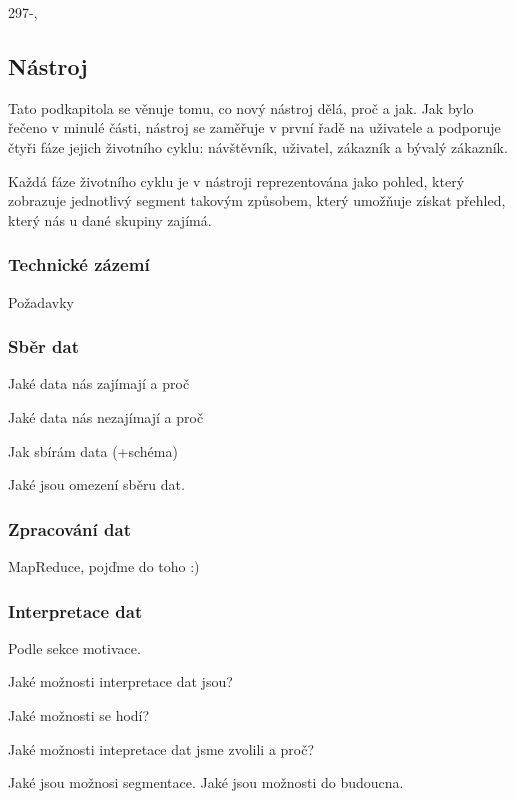 \documentclass[bc,female,java,dept456]{diploma}						%
\begin{document}
297-,





\subsection{Nástroj}

Tato podkapitola se věnuje tomu, co nový nástroj dělá, proč a jak. Jak bylo řečeno v minulé části, nástroj se zaměřuje v první řadě na uživatele a podporuje čtyři fáze jejich životního cyklu: návštěvník, uživatel, zákazník a bývalý zákazník.

Každá fáze životního cyklu je v nástroji reprezentována jako pohled, který zobrazuje jednotlivý segment takovým způsobem, který umožňuje získat přehled, který nás u dané skupiny zajímá.


\subsubsection{Technické zázemí}

Požadavky




\subsubsection{Sběr dat}

Jaké data nás zajímají a proč

Jaké data nás nezajímají a proč

Jak sbírám data (+schéma)

Jaké jsou omezení sběru dat.


\subsubsection{Zpracování dat}

MapReduce, pojďme do toho :)



\subsubsection{Interpretace dat}

Podle sekce motivace.

Jaké možnosti interpretace dat jsou?

Jaké možnosti se hodí?

Jaké možnosti intepretace dat jsme zvolili a proč?

Jaké jsou možnosi segmentace. 
Jaké jsou možnosti do budoucna.
\end{document}
